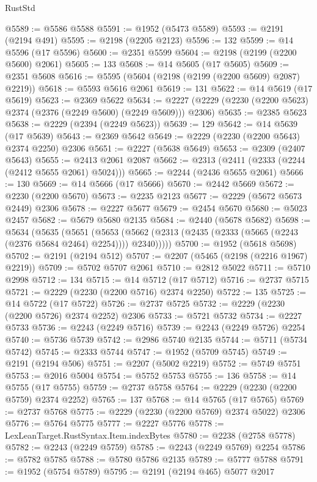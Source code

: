 \begin{lexlean}{RustStd}
\begin{coremodule}
@5589 := @5586 @5588
@5591 := @1952 (@5473 @5589)
@5593 := @2191 (@2194 @491)
@5595 := @2198 (@2205 @2123)
@5596 := 132
@5599 := @14 @5596 (@17 @5596)
@5600 := @2351 @5599
@5604 := @2198 (@2199 (@2200 @5600) @2061)
@5605 := 133
@5608 := @14 @5605 (@17 @5605)
@5609 := @2351 @5608
@5616 := @5595 (@5604 (@2198 (@2199 (@2200 @5609) @2087) @2219))
@5618 := @5593 @5616 @2061
@5619 := 131
@5622 := @14 @5619 (@17 @5619)
@5623 := @2369 @5622
@5634 := @2227 (@2229 (@2230 (@2200 @5623) @2374 (@2376 (@2249 @5600) (@2249 @5609))) @2306)
@5635 := @2385 @5623
@5638 := @2229 (@2394 (@2249 @5623))
@5639 := 129
@5642 := @14 @5639 (@17 @5639)
@5643 := @2369 @5642
@5649 := @2229 (@2230 (@2200 @5643) @2374 @2250) @2306
@5651 := @2227 (@5638 @5649)
@5653 := @2309 (@2407 @5643)
@5655 := @2413 @2061 @2087
@5662 := @2313 (@2411 (@2333 (@2244 (@2412 @5655 @2061) @5024)))
@5665 := @2244 (@2436 @5655 @2061)
@5666 := 130
@5669 := @14 @5666 (@17 @5666)
@5670 := @2442 @5669
@5672 := @2230 (@2200 @5670)
@5673 := @2235 @2123
@5677 := @2229 (@5672 @5673 @2449) @2306
@5678 := @2227 @5677
@5679 := @2454 @5670
@5680 := @5023 @2457
@5682 := @5679 @5680 @2135
@5684 := @2440 (@5678 @5682)
@5698 := @5634
    (@5635
      (@5651
        (@5653 (@5662 (@2313 (@2435 (@2333 (@5665 (@2243 (@2376 @5684 @2464) @2254)))) @2340)))))
@5700 := @1952 (@5618 @5698)
@5702 := @2191 (@2194 @512)
@5707 := @2207 (@5465 (@2198 (@2216 @1967) @2219))
@5709 := @5702 @5707 @2061
@5710 := @2812 @5022
@5711 := @5710 @2998
@5712 := 134
@5715 := @14 @5712 (@17 @5712)
@5716 := @2737 @5715
@5721 := @2229 (@2230 (@2200 @5716) @2374 @2250)
@5722 := 135
@5725 := @14 @5722 (@17 @5722)
@5726 := @2737 @5725
@5732 := @2229 (@2230 (@2200 @5726) @2374 @2252) @2306
@5733 := @5721 @5732
@5734 := @2227 @5733
@5736 := @2243 (@2249 @5716)
@5739 := @2243 (@2249 @5726) @2254
@5740 := @5736 @5739
@5742 := @2986 @5740 @2135
@5744 := @5711 (@5734 @5742)
@5745 := @2333 @5744
@5747 := @1952 (@5709 @5745)
@5749 := @2191 (@2194 @506)
@5751 := @2207 (@5002 @2219)
@5752 := @5749 @5751
@5753 := @2016 @5004
@5754 := @5752 @5753
@5755 := 136
@5758 := @14 @5755 (@17 @5755)
@5759 := @2737 @5758
@5764 := @2229 (@2230 (@2200 @5759) @2374 @2252)
@5765 := 137
@5768 := @14 @5765 (@17 @5765)
@5769 := @2737 @5768
@5775 := @2229 (@2230 (@2200 @5769) @2374 @5022) @2306
@5776 := @5764 @5775
@5777 := @2227 @5776
@5778 := LexLeanTarget.RustSyntax.Item.indexBytes
@5780 := @2238 (@2758 @5778)
@5782 := @2243 (@2249 @5759)
@5785 := @2243 (@2249 @5769) @2254
@5786 := @5782 @5785
@5788 := @5780 @5786 @2135
@5789 := @5777 @5788
@5791 := @1952 (@5754 @5789)
@5795 := @2191 (@2194 @465) @5077 @2017

\end{coremodule}
\end{lexlean}
